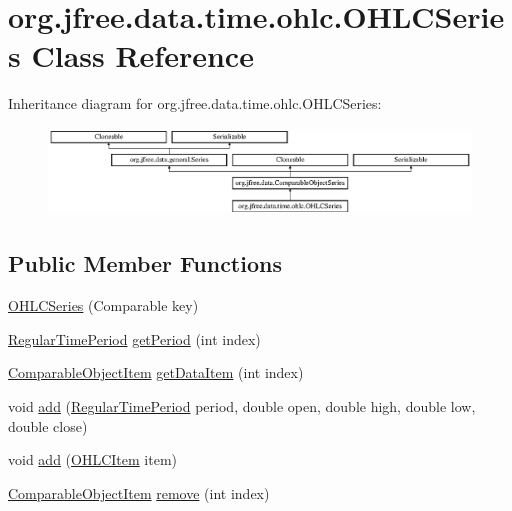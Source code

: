 \hypertarget{classorg_1_1jfree_1_1data_1_1time_1_1ohlc_1_1_o_h_l_c_series}{}\section{org.\+jfree.\+data.\+time.\+ohlc.\+O\+H\+L\+C\+Series Class Reference}
\label{classorg_1_1jfree_1_1data_1_1time_1_1ohlc_1_1_o_h_l_c_series}
Inheritance diagram for org.\+jfree.\+data.\+time.\+ohlc.\+O\+H\+L\+C\+Series\+:\begin{figure}[H]
\begin{center}
\leavevmode
\includegraphics[height=2.314049cm]{classorg_1_1jfree_1_1data_1_1time_1_1ohlc_1_1_o_h_l_c_series}
\end{center}
\end{figure}
\subsection*{Public Member Functions}
\begin{DoxyCompactItemize}
\item 
\mbox{\hyperlink{classorg_1_1jfree_1_1data_1_1time_1_1ohlc_1_1_o_h_l_c_series_affe626c978fe6af4306fab8e0c3a20ea}{O\+H\+L\+C\+Series}} (Comparable key)
\item 
\mbox{\hyperlink{classorg_1_1jfree_1_1data_1_1time_1_1_regular_time_period}{Regular\+Time\+Period}} \mbox{\hyperlink{classorg_1_1jfree_1_1data_1_1time_1_1ohlc_1_1_o_h_l_c_series_aff62f6333a35fc48fc65b8ce1742ccbb}{get\+Period}} (int index)
\item 
\mbox{\hyperlink{classorg_1_1jfree_1_1data_1_1_comparable_object_item}{Comparable\+Object\+Item}} \mbox{\hyperlink{classorg_1_1jfree_1_1data_1_1time_1_1ohlc_1_1_o_h_l_c_series_a55207c2cbe1624465f00101b3e32439c}{get\+Data\+Item}} (int index)
\item 
void \mbox{\hyperlink{classorg_1_1jfree_1_1data_1_1time_1_1ohlc_1_1_o_h_l_c_series_a8710820f7e0d9b77d15202ec2c631641}{add}} (\mbox{\hyperlink{classorg_1_1jfree_1_1data_1_1time_1_1_regular_time_period}{Regular\+Time\+Period}} period, double open, double high, double low, double close)
\item 
void \mbox{\hyperlink{classorg_1_1jfree_1_1data_1_1time_1_1ohlc_1_1_o_h_l_c_series_a1d1b8ffe105d1d603a506633c6057e2c}{add}} (\mbox{\hyperlink{classorg_1_1jfree_1_1data_1_1time_1_1ohlc_1_1_o_h_l_c_item}{O\+H\+L\+C\+Item}} item)
\item 
\mbox{\hyperlink{classorg_1_1jfree_1_1data_1_1_comparable_object_item}{Comparable\+Object\+Item}} \mbox{\hyperlink{classorg_1_1jfree_1_1data_1_1time_1_1ohlc_1_1_o_h_l_c_series_a7d43ed5430d46a4cdc097a4fb15a24b9}{remove}} (int index)
\end{DoxyCompactItemize}
